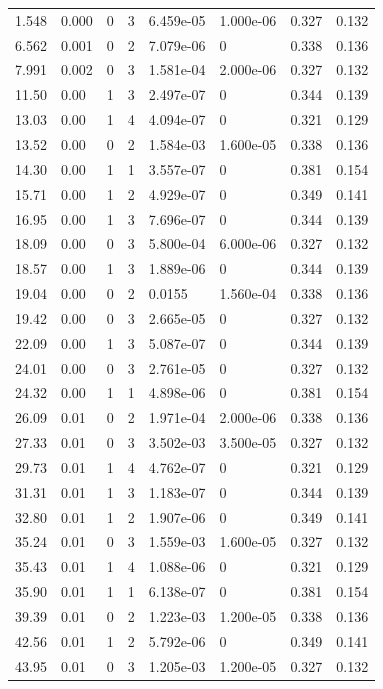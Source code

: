 \documentclass[preview]{standalone}
\begin{document}
{{\begin{tabular}{L{1.2cm}C{1.2cm} C{0.3cm}C{0.5cm} C{1.4cm}C{1.4cm} C{1.4cm}C{1.4cm}}
  1.548  &  0.000  & 0     &  3 &  6.459e-05  & 1.000e-06  & 0.327 &  0.132   \\ 
  6.562  &  0.001  & 0     &  2 &  7.079e-06  & 0  & 0.338 &  0.136   \\ 
  7.991  &  0.002  & 0     &  3 &  1.581e-04  & 2.000e-06  & 0.327 &  0.132   \\ 
  11.50  &  0.00  & 1     &  3 &  2.497e-07  & 0  & 0.344 &  0.139   \\ 
  13.03  &  0.00  & 1     &  4 &  4.094e-07  & 0  & 0.321 &  0.129   \\ 
  13.52  &  0.00  & 0     &  2 &  1.584e-03  & 1.600e-05  & 0.338 &  0.136   \\ 
  14.30  &  0.00  & 1     &  1 &  3.557e-07  & 0  & 0.381 &  0.154   \\ 
  15.71  &  0.00  & 1     &  2 &  4.929e-07  & 0  & 0.349 &  0.141   \\ 
  16.95  &  0.00  & 1     &  3 &  7.696e-07  & 0  & 0.344 &  0.139   \\ 
  18.09  &  0.00  & 0     &  3 &  5.800e-04  & 6.000e-06  & 0.327 &  0.132   \\ 
  18.57  &  0.00  & 1     &  3 &  1.889e-06  & 0  & 0.344 &  0.139   \\ 
  19.04  &  0.00  & 0     &  2 &  0.0155  & 1.560e-04  & 0.338 &  0.136   \\ 
  19.42  &  0.00  & 0     &  3 &  2.665e-05  & 0  & 0.327 &  0.132   \\ 
  22.09  &  0.00  & 1     &  3 &  5.087e-07  & 0  & 0.344 &  0.139   \\ 
  24.01  &  0.00  & 0     &  3 &  2.761e-05  & 0  & 0.327 &  0.132   \\ 
  24.32  &  0.00  & 1     &  1 &  4.898e-06  & 0  & 0.381 &  0.154   \\ 
  26.09  &  0.01  & 0     &  2 &  1.971e-04  & 2.000e-06  & 0.338 &  0.136   \\ 
  27.33  &  0.01  & 0     &  3 &  3.502e-03  & 3.500e-05  & 0.327 &  0.132   \\ 
  29.73  &  0.01  & 1     &  4 &  4.762e-07  & 0  & 0.321 &  0.129   \\ 
  31.31  &  0.01  & 1     &  3 &  1.183e-07  & 0  & 0.344 &  0.139   \\ 
  32.80  &  0.01  & 1     &  2 &  1.907e-06  & 0  & 0.349 &  0.141   \\ 
  35.24  &  0.01  & 0     &  3 &  1.559e-03  & 1.600e-05  & 0.327 &  0.132   \\ 
  35.43  &  0.01  & 1     &  4 &  1.088e-06  & 0  & 0.321 &  0.129   \\ 
  35.90  &  0.01  & 1     &  1 &  6.138e-07  & 0  & 0.381 &  0.154   \\ 
  39.39  &  0.01  & 0     &  2 &  1.223e-03  & 1.200e-05  & 0.338 &  0.136   \\ 
  42.56  &  0.01  & 1     &  2 &  5.792e-06  & 0  & 0.349 &  0.141   \\ 
  43.95  &  0.01  & 0     &  3 &  1.205e-03  & 1.200e-05  & 0.327 &  0.132   \\ 
\hline 
\end{tabular} 

}}
\end{document}
